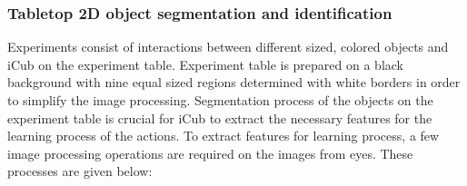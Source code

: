 \documentclass[runningheads,a4paper]{llncs}
\begin{document}
\subsubsection{Tabletop 2D object segmentation and identification\newline\newline}

Experiments consist of interactions between different sized, colored objects and iCub on the experiment table. Experiment table is prepared on a black background with nine equal sized regions determined with white borders in order to simplify the image processing. Segmentation process of the objects on the experiment table is crucial for iCub to extract the necessary features for the learning process of the actions. To extract features for learning process, a few image processing operations are required on the images from eyes. These processes are given below:
\end{document}
